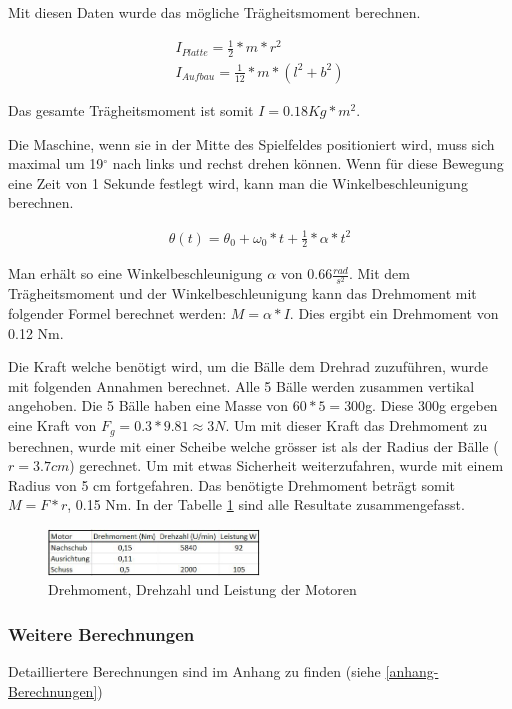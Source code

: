 Mit diesen Daten wurde das mögliche Trägheitsmoment berechnen.

\begin{gather}
	I_{Platte}=\frac{1}{2}*m*r^2 \\
	I_{Aufbau}=\frac{1}{12}*m*(l^2+b^2)
\end{gather}

Das gesamte Trägheitsmoment ist somit $I=0.18 Kg*m^2$.

Die Maschine, wenn sie in der Mitte des Spielfeldes positioniert wird, muss sich maximal um 19$^\circ$ nach links und rechst drehen können. Wenn für diese Bewegung eine Zeit von 1 Sekunde festlegt wird, kann man die Winkelbeschleunigung berechnen.

\begin{gather}
	\theta(t)=\theta_0+\omega_0*t+\frac{1}{2}*\alpha*t^2
\end{gather}

Man erhält so eine Winkelbeschleunigung $\alpha$ von $0.66\frac{rad}{s^2}$.
Mit dem Trägheitsmoment und der Winkelbeschleunigung kann das Drehmoment mit folgender Formel berechnet werden: $M=\alpha*I$. Dies ergibt ein Drehmoment von 0.12 Nm.

Die Kraft welche benötigt wird, um die Bälle dem Drehrad zuzuführen, wurde mit folgenden Annahmen berechnet. Alle 5 Bälle werden zusammen vertikal angehoben. Die 5 Bälle haben eine Masse von $60*5=300$g. Diese 300g ergeben eine Kraft von $F_g=0.3*9.81\approx3 N$. Um mit dieser Kraft das Drehmoment zu berechnen, wurde mit einer Scheibe welche grösser ist als der Radius der Bälle ($r=3.7cm$) gerechnet. Um mit etwas Sicherheit weiterzufahren, wurde mit einem Radius von 5 cm fortgefahren. Das benötigte Drehmoment beträgt somit $M=F*r$, 0.15 Nm.
In der Tabelle \ref{fig:drehmoment} sind alle Resultate zusammengefasst.

\begin{figure}[h!]
	\center
	\includegraphics[width=0.5\textwidth]{../../fig/Tabelle_Drehmomente.jpg}
	\caption{Drehmoment, Drehzahl und Leistung der Motoren}
	\label{fig:drehmoment}
\end{figure} 
\newpage



\subsubsection{Weitere Berechnungen}
Detailliertere Berechnungen sind im Anhang zu finden (siehe \ref{anhang-Berechnungen})